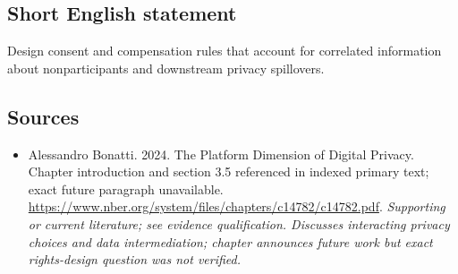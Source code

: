 \documentclass[11pt]{article}
\begin{document}
\subsection{Short English statement}
Design consent and compensation rules that account for correlated information about nonparticipants and downstream privacy spillovers.

\subsection{Sources}
\begin{itemize}\raggedright
\item[\textnormal{[S1]}]\hypertarget{source:30007689:1}{} Alessandro Bonatti. 2024. The Platform Dimension of Digital Privacy. Chapter introduction and section 3.5 referenced in indexed primary text; exact future paragraph unavailable.
\url{https://www.nber.org/system/files/chapters/c14782/c14782.pdf}.
{\small\textit{Supporting or current literature; see evidence qualification. Discusses interacting privacy choices and data intermediation; chapter announces future work but exact rights-design question was not verified.}}
\end{itemize}
\end{document}
